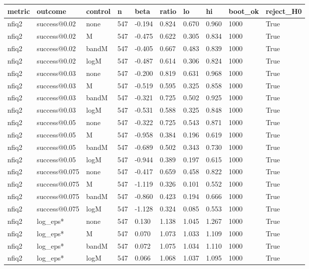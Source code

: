 \begin{tabular}{llllllllll}
\hline
metric & outcome & control & n & beta & ratio & lo & hi & boot\_ok & reject\_H0 \\
\hline
nfiq2 & success@0.02 & none & 547 & -0.194 & 0.824 & 0.670 & 0.960 & 1000 & True \\
nfiq2 & success@0.02 & M & 547 & -0.475 & 0.622 & 0.305 & 0.834 & 1000 & True \\
nfiq2 & success@0.02 & bandM & 547 & -0.405 & 0.667 & 0.483 & 0.839 & 1000 & True \\
nfiq2 & success@0.02 & logM & 547 & -0.487 & 0.614 & 0.306 & 0.824 & 1000 & True \\
nfiq2 & success@0.03 & none & 547 & -0.200 & 0.819 & 0.631 & 0.968 & 1000 & True \\
nfiq2 & success@0.03 & M & 547 & -0.519 & 0.595 & 0.325 & 0.858 & 1000 & True \\
nfiq2 & success@0.03 & bandM & 547 & -0.321 & 0.725 & 0.502 & 0.925 & 1000 & True \\
nfiq2 & success@0.03 & logM & 547 & -0.531 & 0.588 & 0.325 & 0.848 & 1000 & True \\
nfiq2 & success@0.05 & none & 547 & -0.322 & 0.725 & 0.543 & 0.871 & 1000 & True \\
nfiq2 & success@0.05 & M & 547 & -0.958 & 0.384 & 0.196 & 0.619 & 1000 & True \\
nfiq2 & success@0.05 & bandM & 547 & -0.689 & 0.502 & 0.343 & 0.730 & 1000 & True \\
nfiq2 & success@0.05 & logM & 547 & -0.944 & 0.389 & 0.197 & 0.615 & 1000 & True \\
nfiq2 & success@0.075 & none & 547 & -0.417 & 0.659 & 0.458 & 0.822 & 1000 & True \\
nfiq2 & success@0.075 & M & 547 & -1.119 & 0.326 & 0.101 & 0.552 & 1000 & True \\
nfiq2 & success@0.075 & bandM & 547 & -0.860 & 0.423 & 0.194 & 0.666 & 1000 & True \\
nfiq2 & success@0.075 & logM & 547 & -1.128 & 0.324 & 0.085 & 0.553 & 1000 & True \\
nfiq2 & log\_eps* & none & 547 & 0.130 & 1.138 & 1.045 & 1.267 & 1000 & True \\
nfiq2 & log\_eps* & M & 547 & 0.070 & 1.073 & 1.033 & 1.109 & 1000 & True \\
nfiq2 & log\_eps* & bandM & 547 & 0.072 & 1.075 & 1.034 & 1.110 & 1000 & True \\
nfiq2 & log\_eps* & logM & 547 & 0.066 & 1.068 & 1.037 & 1.095 & 1000 & True \\

\end{tabular}
